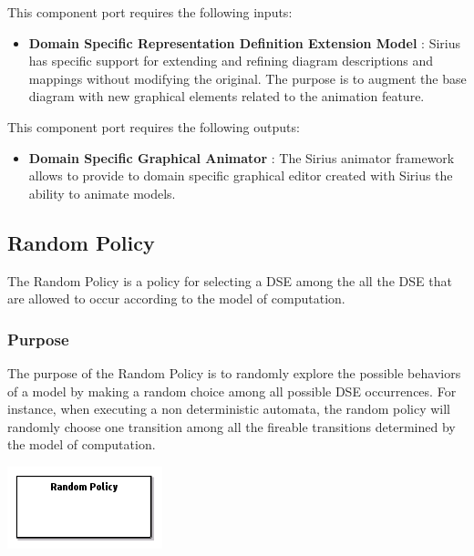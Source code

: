 \documentclass{gemoc} %
\begin{document}
This component port requires the following inputs:
\begin{itemize}
  \item \textbf{Domain Specific Representation Definition Extension Model} :
Sirius has specific support for extending and refining diagram descriptions and mappings without modifying the original. The purpose is to augment the base diagram with new graphical elements related to the animation feature.
\end{itemize}

This component port requires the following outputs:
\begin{itemize}
  \item \textbf{Domain Specific Graphical Animator} :
The Sirius animator framework allows to provide to domain specific graphical editor created with Sirius the ability to animate models.
\end{itemize}

\subsection{Random Policy}
The Random Policy is a policy for selecting a DSE among the all the DSE that are allowed to occur according to the model of computation.

\subsubsection{Purpose}
The purpose of the Random Policy is to randomly explore the possible behaviors of a model by making a random choice among all possible DSE occurrences. For instance, when executing a non deterministic automata, the random policy will randomly choose one transition among all the fireable transitions determined by the model of computation.
\begin{center}
\includegraphics*[trim=0.0cm 0.0cm 0cm 0.0cm, clip=true]{../images/generated/Generated_Random_Policy.png}
\end{center}
\end{document}
